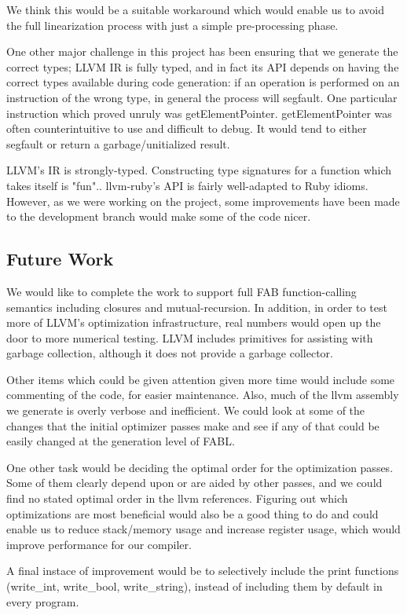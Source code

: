 \documentclass[11pt]{article} %
\begin{document}
We think this would be a suitable workaround which would enable us to avoid the full linearization process with just a simple pre-processing phase.

One other major challenge in this project has been ensuring that we generate the correct types; LLVM IR is fully typed, and in fact its API depends on having the correct types available during code generation: if an operation is performed on an instruction of the wrong type, in general the process will segfault. One particular instruction which proved unruly was getElementPointer. getElementPointer was often counterintuitive to use and difficult to debug. It would tend to either segfault or return a garbage/unitialized result.

LLVM's IR is strongly-typed. Constructing type signatures for a function which takes itself is "fun".. llvm-ruby's API is fairly well-adapted to Ruby idioms. However, as we were working on the project, some improvements have been made to the development branch would make some of the code nicer.

\subsection{Future Work}

We would like to complete the work to support full FAB function-calling semantics including closures and mutual-recursion. In addition, in order to test more of LLVM's optimization infrastructure, real numbers would open up the door to more numerical testing. LLVM includes primitives for assisting with garbage collection, although it does not provide a garbage collector.

Other items which could be given attention given more time would include some commenting of the code, for easier maintenance. Also, much of the llvm assembly we generate is overly verbose and inefficient. We could look at some of the changes that the initial optimizer passes make and see if any of that could be easily changed at the generation level of FABL.

One other task would be deciding the optimal order for the optimization passes. Some of them clearly depend upon or are aided by other passes, and we could find no stated optimal order in the llvm references. Figuring out which optimizations are most beneficial would also be a good thing to do and could enable us to reduce stack/memory usage and increase register usage, which would improve performance for our compiler.

A final instace of improvement would be to selectively include the print functions (write\_int, write\_bool, write\_string), instead of including them by default in every program.
\end{document}
